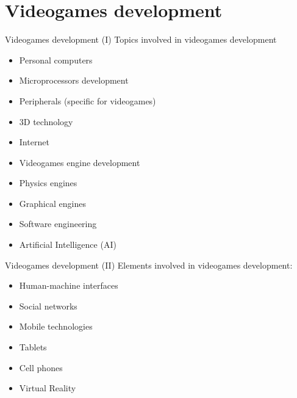 \documentclass[10pt,compress]{beamer} %
\begin{document}
\section{Videogames development}
\begin{frame}{Videogames development (I)}
	Topics involved in videogames development
	\begin{itemize}
		\item Personal computers
		\item Microprocessors development
		\item Peripherals (specific for videogames)
		\item 3D technology
		\item Internet
		\item Videogames engine development
		\item Physics engines
		\item Graphical engines
		\item Software engineering
		\item Artificial Intelligence (AI)
	\end{itemize}
\end{frame}

\begin{frame}{Videogames development (II)}
	Elements involved in videogames development:
	\begin{itemize}
		\item Human-machine interfaces
		\item Social networks
		\item Mobile technologies
		\item Tablets
        \item Cell phones
        \item Virtual Reality
	\end{itemize}
\end{frame}
\end{document}
